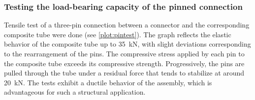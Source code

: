 \subsubsection{Testing the load-bearing capacity of the pinned connection}
Tensile test of a three-pin connection between a connector and the corresponding composite tube were done (see \cref{plot:pintest}). The graph reflects the elastic behavior of the composite tube up to \SI{35}{kN}, with slight deviations corresponding to the rearrangement of the pins. The compressive stress applied by each pin to the composite tube exceeds its compressive strength. Progressively, the pins are pulled through the tube under a residual force that tends to stabilize at around \SI{20}{kN}. The tests exhibit a ductile behavior of the assembly, which is advantageous for such a structural application.


